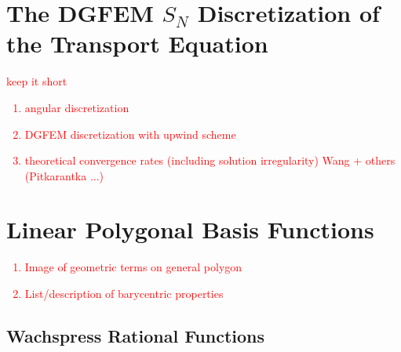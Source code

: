\documentclass[preprint,10pt]{elsarticle}
\newcommand{\tcr}[1]{\textcolor{red}{#1}}
\newcommand{\Introfigpath}[1]{../../../Document/Rev0/figures/sec_Intro/{#1}}
\begin{document}
\iffalse
\begin{figure}[hbt]
\centering
\texttt{[image: \\Introfigpath\{locally\_refined\_vertices.png]}}
\caption{Local mesh refinement of an initial quadrilateral cell (left) leads to a degenerate pentagonal cell (right) without the use of a hanging node.}
\label{fig::Intro_locally_refined_vertices}
\end{figure}
\fi

\section{The DGFEM $S_N$ Discretization of the Transport Equation} \label{sec::dgfem}
\tcr
{ keep it short
\begin{enumerate}
\item angular discretization
\item DGFEM discretization with upwind scheme
\item theoretical convergence rates (including solution irregularity) Wang + others (Pitkarantka ...)
\end{enumerate}
}


\section{Linear Polygonal Basis Functions} \label{sec::linpoly}
\tcr
{
\begin{enumerate}
\item Image of geometric terms on general polygon
\item List/description of barycentric properties
\end{enumerate}
}

\subsection{Wachspress Rational Functions}
\end{document}
